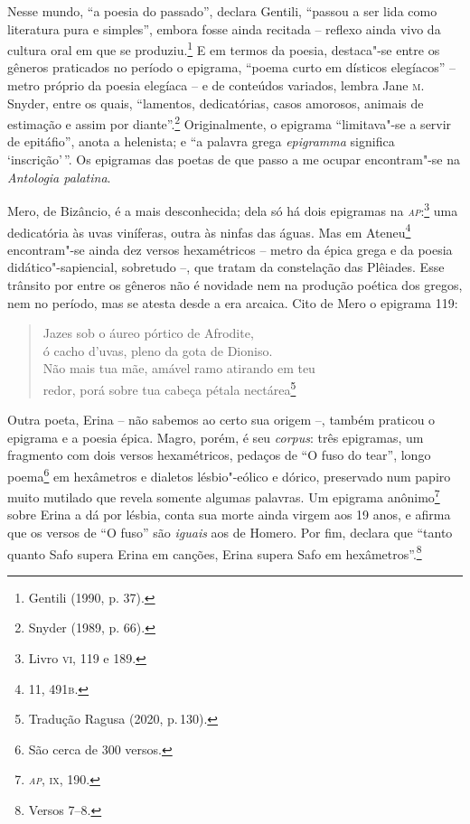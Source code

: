 Nesse mundo, “a poesia do passado”, declara Gentili, “passou a
ser lida como literatura pura e simples”, embora fosse ainda recitada -- reflexo
ainda vivo da cultura oral em que se produziu.\footnote{ Gentili (1990, p. 37).} E em termos da poesia,
destaca"-se entre os gêneros praticados no período o epigrama, “poema curto em
dísticos elegíacos” -- metro próprio da poesia elegíaca -- e de conteúdos
variados, lembra Jane \textsc{m}.\,Snyder, entre os quais, “lamentos,
dedicatórias, casos amorosos, animais de estimação e assim por diante”.\footnote{ Snyder (1989, p. 66).}
Originalmente, o epigrama “limitava"-se a servir de epitáfio”, anota a
helenista; e “a palavra grega \textit{epigramma} significa ‘inscrição’\,”. Os
epigramas das poetas de que passo a me ocupar encontram"-se na \textit{Antologia
palatina}.

Mero, de Bizâncio, é a mais desconhecida; dela só há dois epigramas na \textit{\textsc{ap}}:\footnote{Livro \textsc{vi}, 119 e 189.} uma dedicatória às uvas viníferas,
outra às ninfas das águas. Mas em Ateneu\footnote{11, 491\textsc{b}.} encontram"-se ainda dez
versos hexamétricos -- metro da épica grega e da poesia didático"-sapiencial,
sobretudo --, que tratam da constelação das Plêiades. Esse trânsito por entre os
gêneros não é novidade nem na produção poética dos gregos, nem no período, mas
se atesta desde a era arcaica.
Cito de Mero o epigrama 119:

\begin{verse}
\small{Jazes sob o áureo pórtico de Afrodite,\\
ó cacho d'uvas, pleno da gota de Dioniso.\\
Não mais tua mãe, amável ramo atirando em teu\\
redor, porá sobre tua cabeça pétala nectárea}\footnote{Tradução Ragusa (2020, p.\,130).}
\end{verse}

Outra poeta, Erina -- não sabemos ao certo sua origem --, também praticou o
epigrama e a poesia épica. Magro, porém, é seu \textit{corpus}: três epigramas, um fragmento com dois versos hexamétricos, pedaços
de “O fuso do tear”, longo poema\footnote{São cerca de 300 versos.} em hexâmetros e dialetos
lésbio"-eólico e dórico, preservado num papiro muito mutilado que revela somente
algumas palavras. Um epigrama anônimo\footnote{\textit{\textsc{ap}}, \textsc{ix}, 190.}
sobre Erina a dá por lésbia, conta sua morte ainda virgem aos 19 anos, e
afirma que os versos de “O fuso” são \textit{iguais} aos de Homero. Por fim,
declara que ``tanto quanto Safo supera Erina em canções, Erina supera
Safo em hexâmetros”.\footnote{Versos 7--8.}


